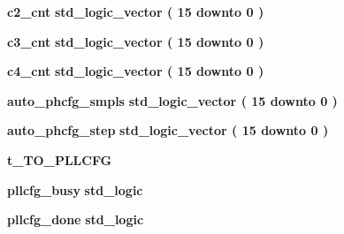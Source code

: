 \begin{DoxyCompactItemize}
\item 
{\bf c2\+\_\+cnt} {\bfseries {\bfseries \textcolor{comment}{std\+\_\+logic\+\_\+vector}\textcolor{vhdlchar}{ }\textcolor{vhdlchar}{(}\textcolor{vhdlchar}{ }\textcolor{vhdlchar}{ } \textcolor{vhdldigit}{15} \textcolor{vhdlchar}{ }\textcolor{keywordflow}{downto}\textcolor{vhdlchar}{ }\textcolor{vhdlchar}{ } \textcolor{vhdldigit}{0} \textcolor{vhdlchar}{ }\textcolor{vhdlchar}{)}\textcolor{vhdlchar}{ }}} 
\item 
{\bf c3\+\_\+cnt} {\bfseries {\bfseries \textcolor{comment}{std\+\_\+logic\+\_\+vector}\textcolor{vhdlchar}{ }\textcolor{vhdlchar}{(}\textcolor{vhdlchar}{ }\textcolor{vhdlchar}{ } \textcolor{vhdldigit}{15} \textcolor{vhdlchar}{ }\textcolor{keywordflow}{downto}\textcolor{vhdlchar}{ }\textcolor{vhdlchar}{ } \textcolor{vhdldigit}{0} \textcolor{vhdlchar}{ }\textcolor{vhdlchar}{)}\textcolor{vhdlchar}{ }}} 
\item 
{\bf c4\+\_\+cnt} {\bfseries {\bfseries \textcolor{comment}{std\+\_\+logic\+\_\+vector}\textcolor{vhdlchar}{ }\textcolor{vhdlchar}{(}\textcolor{vhdlchar}{ }\textcolor{vhdlchar}{ } \textcolor{vhdldigit}{15} \textcolor{vhdlchar}{ }\textcolor{keywordflow}{downto}\textcolor{vhdlchar}{ }\textcolor{vhdlchar}{ } \textcolor{vhdldigit}{0} \textcolor{vhdlchar}{ }\textcolor{vhdlchar}{)}\textcolor{vhdlchar}{ }}} 
\item 
{\bf auto\+\_\+phcfg\+\_\+smpls} {\bfseries {\bfseries \textcolor{comment}{std\+\_\+logic\+\_\+vector}\textcolor{vhdlchar}{ }\textcolor{vhdlchar}{(}\textcolor{vhdlchar}{ }\textcolor{vhdlchar}{ } \textcolor{vhdldigit}{15} \textcolor{vhdlchar}{ }\textcolor{keywordflow}{downto}\textcolor{vhdlchar}{ }\textcolor{vhdlchar}{ } \textcolor{vhdldigit}{0} \textcolor{vhdlchar}{ }\textcolor{vhdlchar}{)}\textcolor{vhdlchar}{ }}} 
\item 
{\bf auto\+\_\+phcfg\+\_\+step} {\bfseries {\bfseries \textcolor{comment}{std\+\_\+logic\+\_\+vector}\textcolor{vhdlchar}{ }\textcolor{vhdlchar}{(}\textcolor{vhdlchar}{ }\textcolor{vhdlchar}{ } \textcolor{vhdldigit}{15} \textcolor{vhdlchar}{ }\textcolor{keywordflow}{downto}\textcolor{vhdlchar}{ }\textcolor{vhdlchar}{ } \textcolor{vhdldigit}{0} \textcolor{vhdlchar}{ }\textcolor{vhdlchar}{)}\textcolor{vhdlchar}{ }}} 
\item 
{\bf t\+\_\+\+T\+O\+\_\+\+P\+L\+L\+C\+FG} {\bfseries  }
\item 
{\bf pllcfg\+\_\+busy} {\bfseries {\bfseries \textcolor{comment}{std\+\_\+logic}\textcolor{vhdlchar}{ }}} 
\item 
{\bf pllcfg\+\_\+done} {\bfseries {\bfseries \textcolor{comment}{std\+\_\+logic}\textcolor{vhdlchar}{ }}} 

\end{DoxyCompactItemize}
